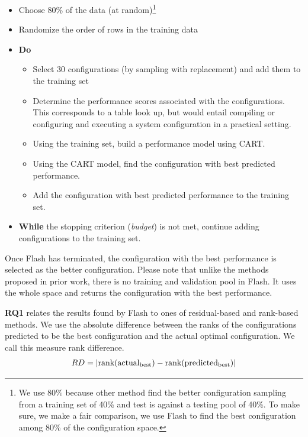 \documentclass[10pt,journal,compsoc]{IEEEtran}
\DeclarePairedDelimiter\abs{\lvert}{\rvert}%
\newcommand{\flash}{{\sc Flash}\xspace}
\begin{document}
\begin{itemize}[leftmargin=*]
    \item Choose 80\% of the data (at random)\footnote{We use 80\% because other method find the better configuration sampling from a training set of 40\% and test is against a testing pool of 40\%. To make sure, we make a fair comparison, we use \flash to find the best configuration among 80\% of the configuration space.}
    \item Randomize the order of rows  in  the training data
    \item \textbf{Do}
    \begin{itemize}
    \item Select 30 configurations (by sampling with replacement) and add them to the training set
        \item Determine the performance scores associated with the configurations. This corresponds to  a table look up, but would entail compiling or configuring and executing a system configuration in a practical setting.
        \item Using the training set, build a performance model using CART.
        \item Using the CART model, find the configuration with best predicted performance.
        \item Add the configuration with best predicted performance to the training set.
    \end{itemize}
    \item \textbf{While} the stopping criterion (\textit{budget}) is not met, continue adding configurations to the training set.
\end{itemize}

Once \flash has terminated, the configuration with the best performance is selected as the better configuration. Please note that unlike the methods proposed in prior work, there is no training and validation pool in \flash. It uses the whole space and returns the configuration with the best performance. 



\textbf{RQ1} relates the results found by \flash to ones of residual-based and rank-based methods. We use the absolute difference between the ranks of the configurations predicted to be the best configuration and the actual optimal configuration. We call this measure rank difference.
\begin{equation}\label{eq:rankdiff}
    \begin{split}
        RD &= \abs[Big]{\mathrm{rank(actual_{best})} - \mathrm{rank(predicted_{best})}}\\
    \end{split}
\end{equation}
\end{document}
